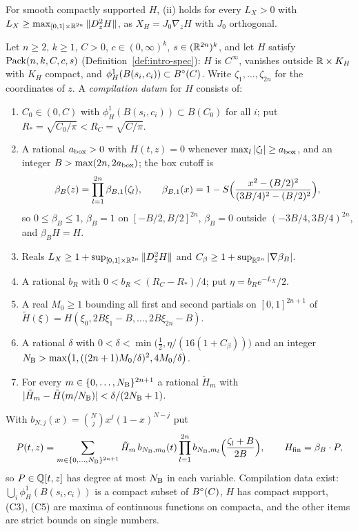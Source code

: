 For smooth compactly supported $H$, (ii) holds for every $L_X>0$ with $L_X\ge\max_{[0,1]\times\mathbb{R}^{2n}}\|D^2_zH\|$, as $X_H=J_0\nabla_zH$ with $J_0$ orthogonal.

Let $n\ge2$, $k\ge1$, $C>0$, $c\in(0,\infty)^k$, $s\in(\mathbb{R}^{2n})^k$, and let $H$ satisfy $\mathrm{Pack}(n,k,C,c,s)$ (Definition~\ref{def:intro-spec}): $H$ is $C^\infty$, vanishes outside $\mathbb{R}\times K_H$ with $K_H$ compact, and $\phi^1_H(B(s_i,c_i))\subset B^{\circ}(C)$. Write $\zeta_1,\dots,\zeta_{2n}$ for the coordinates of $z$. A \emph{compilation datum} for $H$ consists of:

\begin{enumerate}[label=(C\arabic*)]
\item $C_0\in(0,C)$ with $\phi^1_H(B(s_i,c_i))\subset B(C_0)$ for all $i$; put $R_*=\sqrt{C_0/\pi}<R_C=\sqrt{C/\pi}$.
\item A rational $a_{\rm box}>0$ with $H(t,z)=0$ whenever $\max_l|\zeta_l|\ge a_{\rm box}$, and an integer $B>\max(2n,2a_{\rm box})$; the box cutoff is
 \[
 \beta_B(z)=\prod_{l=1}^{2n}\beta_{B,1}(\zeta_l),\qquad
 \beta_{B,1}(x)=1-S\Bigl(\frac{x^2-(B/2)^2}{(3B/4)^2-(B/2)^2}\Bigr),
 \]
 so $0\le\beta_B\le1$, $\beta_B=1$ on $[-B/2,B/2]^{2n}$, $\beta_B=0$ outside $(-3B/4,3B/4)^{2n}$, and $\beta_BH=H$.
\item Reals $L_X\ge1+\sup_{[0,1]\times\mathbb{R}^{2n}}\|D^2_zH\|$ and $C_\beta\ge1+\sup_{\mathbb{R}^{2n}}|\nabla\beta_B|$.
\item A rational $b_R$ with $0<b_R<(R_C-R_*)/4$; put $\eta=b_Re^{-L_X}/2$.
\item A real $M_0\ge1$ bounding all first and second partials on $[0,1]^{2n+1}$ of $\tilde H(\xi)=H(\xi_0,2B\xi_1-B,\dots,2B\xi_{2n}-B)$.
\item A rational $\delta$ with $0<\delta<\min\bigl(\tfrac12,\eta/(16(1+C_\beta))\bigr)$ and an integer $N_{\rm B}>\max\bigl(1,((2n+1)M_0/\delta)^2,4M_0/\delta\bigr)$.
\item For every $m\in\{0,\dots,N_{\rm B}\}^{2n+1}$ a rational $\tilde H_m$ with $|\tilde H_m-\tilde H(m/N_{\rm B})|<\delta/(2N_{\rm B}+1)$.
\end{enumerate}
With $b_{N,j}(x)=\binom Njx^j(1-x)^{N-j}$ put
\[
 P(t,z)=\sum_{m\in\{0,\dots,N_{\rm B}\}^{2n+1}}\tilde H_m\,b_{N_{\rm B},m_0}(t)\prod_{l=1}^{2n}b_{N_{\rm B},m_l}\Bigl(\frac{\zeta_l+B}{2B}\Bigr),
 \qquad H_{\mathrm{fin}}=\beta_B\cdot P,
\]
so $P\in\mathbb{Q}[t,z]$ has degree at most $N_{\rm B}$ in each variable. Compilation data exist: $\bigcup_i\phi^1_H(B(s_i,c_i))$ is a compact subset of $B^{\circ}(C)$, $H$ has compact support, (C3), (C5) are maxima of continuous functions on compacta, and the other items are strict bounds on single numbers.

